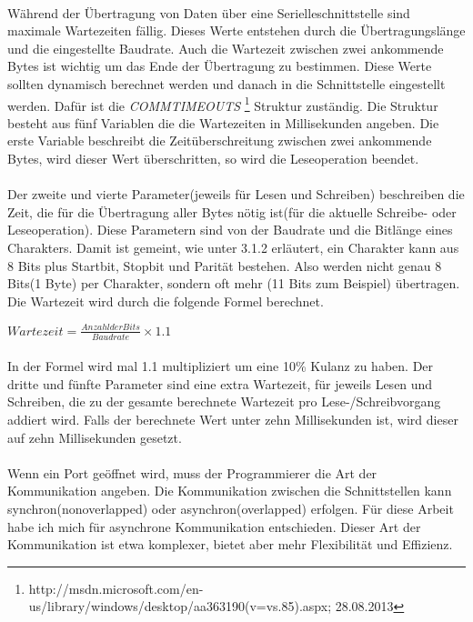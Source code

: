 \paragraph{}
Während der Übertragung von Daten über eine Serielleschnittstelle sind maximale Wartezeiten fällig. Dieses Werte entstehen durch die Übertragungslänge und die eingestellte Baudrate. Auch die Wartezeit zwischen zwei ankommende Bytes ist wichtig um das Ende der Übertragung zu bestimmen. Diese Werte sollten dynamisch berechnet werden und danach in die Schnittstelle eingestellt werden. Dafür ist die \textit{COMMTIMEOUTS} \footnote{http://msdn.microsoft.com/en-us/library/windows/desktop/aa363190(v=vs.85).aspx; 28.08.2013} Struktur zuständig. Die Struktur besteht aus fünf Variablen die die Wartezeiten in Millisekunden angeben. Die erste Variable beschreibt die Zeitüberschreitung zwischen zwei ankommende Bytes, wird dieser Wert überschritten, so wird die Leseoperation beendet.

\paragraph{}
Der zweite und vierte Parameter(jeweils für Lesen und Schreiben) beschreiben die Zeit, die für die Übertragung aller Bytes nötig ist(für die aktuelle Schreibe- oder Leseoperation). Diese Parametern sind von der Baudrate und die Bitlänge eines Charakters. Damit ist gemeint, wie unter 3.1.2 erläutert, ein Charakter kann aus 8 Bits plus Startbit, Stopbit und Parität bestehen. Also werden nicht genau 8 Bits(1 Byte) per Charakter, sondern oft mehr (11 Bits zum Beispiel) übertragen. Die Wartezeit wird durch die folgende Formel berechnet.

\begin{center}
$ Wartezeit = \frac{Anzahl der Bits}{Baudrate} \times 1.1$
\end{center}

\paragraph{}
In der Formel wird mal 1.1 multipliziert um eine 10\% Kulanz zu haben. Der dritte und fünfte Parameter sind eine extra Wartezeit, für jeweils Lesen und Schreiben, die zu der gesamte berechnete Wartezeit pro Lese-/Schreibvorgang addiert wird. Falls der berechnete Wert unter zehn Millisekunden ist, wird dieser auf zehn Millisekunden gesetzt.


\paragraph{}
Wenn ein Port geöffnet wird, muss der Programmierer die Art der Kommunikation angeben. Die Kommunikation zwischen die Schnittstellen kann synchron(nonoverlapped) oder asynchron(overlapped) erfolgen. Für diese Arbeit habe ich mich für asynchrone Kommunikation entschieden. Dieser Art der Kommunikation ist etwa komplexer, bietet aber mehr Flexibilität und Effizienz.



